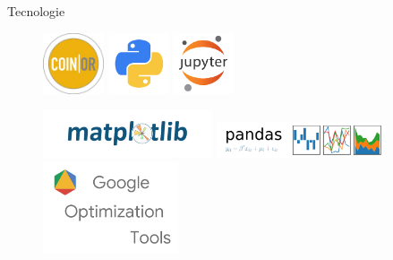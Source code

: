 \documentclass{beamer}
\begin{document}
\begin{frame}{Tecnologie}
	\vspace{.5em}
	\begin{minipage}[c]{0.2\textwidth}
		\begin{figure}
			\centering
			\includegraphics[width=1.8cm]{figures/coin_banner}
			\vspace{.5em}
			\includegraphics[width=1.8cm]{figures/python}
			\vspace{.5em}
			\includegraphics[width=1.8cm]{figures/jupyter}
		\end{figure}
	\end{minipage}
	\hfill
	\begin{minipage}[c]{0.6\textwidth}
		\begin{figure}
			\centering
			\includegraphics[width=5cm]{figures/matplotlib-1}
			\vspace{.5em}
			\includegraphics[width=5cm]{figures/pandas_logo}
			\vspace{.5em}
			\includegraphics[width=4cm]{figures/google_or_tools}
		\end{figure}
	\end{minipage}		
\end{frame}
\end{document}
